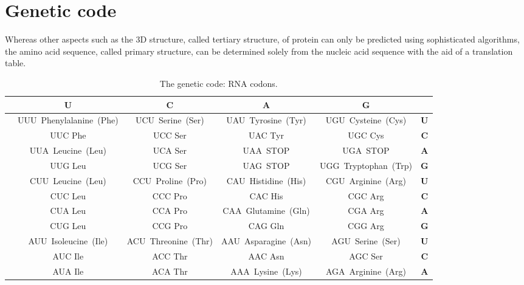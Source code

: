 \hypertarget{genetic-code-1}{%
\section{Genetic code}\label{genetic-code-1}}

Whereas other aspects such as the 3D structure, called tertiary structure, of protein can only be predicted using sophisticated algorithms, the amino acid sequence, called primary structure, can be determined solely from the nucleic acid sequence with the aid of a translation table.

\begingroup\fontsize{7}{9}\selectfont

\begin{longtable}[t]{>{\bfseries}ccccc>{\bfseries}c}
\caption{\label{tab:geneticcode}The genetic code: RNA codons.}\\
\toprule
 & U & C & A & G & \\
\midrule
\rowcolor{gray!6}   & UUU Phenylalanine (Phe) & UCU Serine (Ser) & UAU Tyrosine (Tyr) & UGU Cysteine (Cys) & U\\

 & UUC Phe & UCC Ser & UAC Tyr & UGC Cys & C\\

\rowcolor{gray!6}   & UUA Leucine (Leu) & UCA Ser & UAA STOP & UGA STOP & A\\

\multirow{-4}{*}{\centering\arraybackslash U} & UUG Leu & UCG Ser & UAG STOP & UGG Tryptophan (Trp) & G\\
\cmidrule{1-6}
\rowcolor{gray!6}   & CUU Leucine (Leu) & CCU Proline (Pro) & CAU Histidine (His) & CGU Arginine (Arg) & U\\

 & CUC Leu & CCC Pro & CAC His & CGC Arg & C\\

\rowcolor{gray!6}   & CUA Leu & CCA Pro & CAA Glutamine (Gln) & CGA Arg & A\\

\multirow{-4}{*}{\centering\arraybackslash C} & CUG Leu & CCG Pro & CAG Gln & CGG Arg & G\\
\cmidrule{1-6}
\rowcolor{gray!6}   & AUU Isoleucine (Ile) & ACU Threonine (Thr) & AAU Asparagine (Asn) & AGU Serine (Ser) & U\\

 & AUC Ile & ACC Thr & AAC Asn & AGC Ser & C\\

\rowcolor{gray!6}   & AUA Ile & ACA Thr & AAA Lysine (Lys) & AGA Arginine (Arg) & A\\


\end{longtable}
